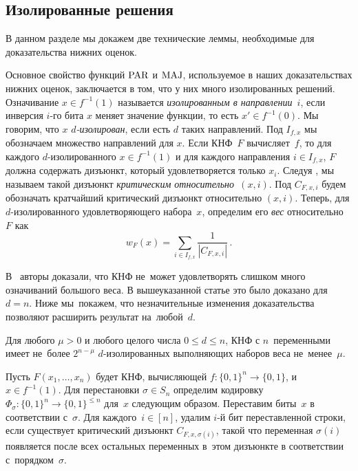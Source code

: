 \subsection{Изолированные решения}\label{sec:isolated}
В данном разделе мы докажем две технические леммы, необходимые для доказательства нижних оценок.

Основное свойство функций $\operatorname{PAR}$ и $\operatorname{MAJ}$, используемое в наших доказательствах нижних оценок, заключается в том, что у них много изолированных решений. Означивание $x \in f^{-1}(1)$ называется \emph{изолированным в направлении~$i$}, если инверсия $i$-го бита $x$ меняет значение функции, то есть $x' \in f^{-1}(0)$. Мы говорим, что $x$ \emph{$d$-изолирован}, если есть $d$ таких направлений. Под $I_{f, x}$ мы обозначаем множество направлений для $x$. Если КНФ~$F$
вычисляет~$f$, то для каждого $d$-изолированного $x \in f^{-1}(1)$ и для каждого направления $i \in I_{f, x}$, $F$ должна содержать
дизъюнкт, который удовлетворяется только $x_i$. Следуя \cite{DBLP:journals/cjtcs/PaturiPZ99}, мы называем такой дизъюнкт \emph{критическим относительно~$(x,i)$}.
Под $C_{F,x,i}$ будем обозначать кратчайший критический дизъюнкт относительно $(x,i)$.
Теперь, для $d$-изолированного удовлетворяющего набора~$x$, определим его \emph{вес} относительно~$F$ как
\[w_F(x) = \sum\limits_{i \in I_{f, x}} \frac{1}{|C_{F,x,i}|} \, .\]

В~\cite{DBLP:journals/cjtcs/PaturiPZ99} авторы доказали,
что КНФ не~может удовлетворять слишком 
много означиваний большого веса. В вышеуказанной статье это было доказано для $d=n$. 
Ниже мы~покажем, что незначительные изменения 
доказательства позволяют расширить результат на~любой~$d$.

\begin{lemma}\label{lemma:isolatedweight}
	Для любого $\mu>0$ и любого целого числа $0 \le d \le n$, 
	КНФ с $n$~переменными имеет не~более $2^{n - \mu}$ $d$-изолированных выполняющих наборов веса не~менее~$\mu$.
\end{lemma}

Пусть $F(x_1, \dotsc, x_n)$ будет КНФ, вычисляющей $f \colon \{0,1\}^n \to \{0,1\}$, и $x \in f^{-1}(1)$.
Для перестановки $\sigma \in S_n$ определим 
кодировку $\Phi_\sigma \colon \{0,1\}^n \to \{0,1\}^{\le n}$ для~$x$ следующим образом.
Переставим биты~$x$ в соответствии с~$\sigma$. 
Для каждого~$i \in [n]$, удалим $i$-й бит переставленной строки, если существует критический дизъюнкт $C_{F, x, \sigma(i)}$, 
такой что 
переменная $\sigma(i)$ появляется после всех остальных переменных в~этом дизъюнкте 
в соответствии с~порядком~$\sigma$.


